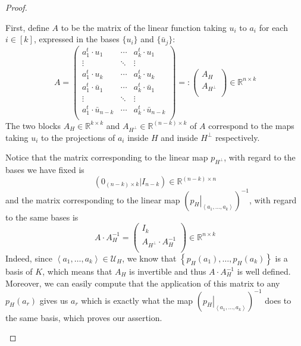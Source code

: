 \begin{proof}
\begin{b_item}
First, define $A$ to be the matrix of the linear function taking $u_i$ to $a_i$ for each $i\in[k]$, expressed in the bases $\{u_i\}$ and $\{\bar{u}_j\}$:
$$A=\left(\begin{array}{ccc}
a^t_1\cdot u_1&\cdots&a^t_k\cdot u_1\\
\vdots&\ddots&\vdots\\
a^t_1\cdot u_k&\cdots&a^t_k\cdot u_k\\
\hline
a^t_1\cdot \bar{u}_1&\cdots&a^t_k\cdot \bar{u}_1\\
\vdots&\ddots&\vdots\\
a^t_1\cdot \bar{u}_{n-k}&\cdots&a^t_k\cdot \bar{u}_{n-k}\\
\end{array}\right)=:
\left(\begin{array}{c}A_H\\\hline A_{H^{\perp}}\\
\end{array}\right)
\in\mathbb{R}^{n\times k}$$
The two blocks $A_H\in\mathbb{R}^{k\times k}$ and $A_{H^{\perp}}\in\mathbb{R}^{(n-k)\times k}$ of $A$ correspond to the maps taking $u_i$ to the projections of $a_i$ inside $H$ and inside $H^{\perp}$ respectively.

Notice that the matrix corresponding to the linear map $p_{H^{\perp}}$, with regard to the bases we have fixed is
$$\left(0_{(n-k)\times k}|I_{n-k}\right)\in\mathbb{R}^{(n-k)\times n}$$
and the matrix corresponding to the linear map $\left(\left.p_H\right|_{\left<a_1,\ldots,a_k\right>}\right)^{-1}$, with regard to the same bases is
$$A\cdot A_H^{-1}=\left(\begin{array}{c}I_k\\\hline A_{H^{\perp}}\cdot A_H^{-1}\\\end{array}\right)\in\mathbb{R}^{n\times k}$$
Indeed, since $\left<a_1,\ldots,a_k\right>\in\mathcal{U}_H$, we know that $\left\{p_H(a_1),\ldots,p_H(a_k)\right\}$ is a basis of $K$, which means that $A_H$ is invertible and thus $A\cdot A_H^{-1}$ is well defined. Moreover, we can easily compute that the application of this matrix to any $p_H(a_r)$ gives us $a_r$ which is exactly what the map $\left(\left.p_H\right|_{\left<a_1,\ldots,a_k\right>}\right)^{-1}$ does to the same basis, which proves our assertion.


\end{b_item}
\end{proof}
